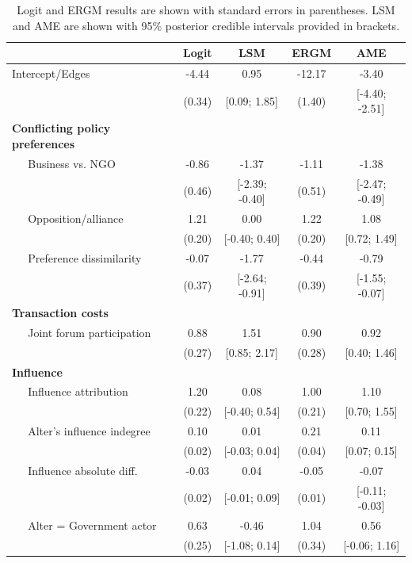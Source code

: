 \documentclass[12pt,pdflatex]{elsarticle}
\begin{document}
\begin{table}[ht]
\centering
\caption{Logit and ERGM results are shown with standard errors in parentheses. LSM and AME are shown with 95\% posterior credible intervals provided in brackets.}
\begin{tabular}{lcccc}
   & Logit & LSM & ERGM & AME \\ 
  \hline\hline
  Intercept/Edges & -4.44 & 0.95 & -12.17 & -3.40 \\ 
   & (0.34) & [0.09; 1.85] & (1.40) & [-4.40; -2.51] \\ 
  \textbf{Conflicting policy preferences} &  &  &  &  \\ 
  $\;\;\;\;$ Business vs. NGO & -0.86 & -1.37 & -1.11 & -1.38 \\ 
   & (0.46) & [-2.39; -0.40] & (0.51) & [-2.47; -0.49] \\ 
  $\;\;\;\;$ Opposition/alliance & 1.21 & 0.00 & 1.22 & 1.08 \\ 
   & (0.20) & [-0.40; 0.40] & (0.20) & [0.72; 1.49] \\ 
  $\;\;\;\;$ Preference dissimilarity & -0.07 & -1.77 & -0.44 & -0.79 \\ 
   & (0.37) & [-2.64; -0.91] & (0.39) & [-1.55; -0.07] \\ 
  \textbf{Transaction costs} &  &  &  &  \\ 
  $\;\;\;\;$ Joint forum participation & 0.88 & 1.51 & 0.90 & 0.92 \\ 
   & (0.27) & [0.85; 2.17] & (0.28) & [0.40; 1.46] \\ 
  \textbf{Influence} &  &  &  &  \\ 
  $\;\;\;\;$ Influence attribution & 1.20 & 0.08 & 1.00 & 1.10 \\ 
   & (0.22) & [-0.40; 0.54] & (0.21) & [0.70; 1.55] \\ 
  $\;\;\;\;$ Alter's influence indegree & 0.10 & 0.01 & 0.21 & 0.11 \\ 
   & (0.02) & [-0.03; 0.04] & (0.04) & [0.07; 0.15] \\ 
  $\;\;\;\;$ Influence absolute diff. & -0.03 & 0.04 & -0.05 & -0.07 \\ 
   & (0.02) & [-0.01; 0.09] & (0.01) & [-0.11; -0.03] \\ 
  $\;\;\;\;$ Alter = Government actor & 0.63 & -0.46 & 1.04 & 0.56 \\ 
   & (0.25) & [-1.08; 0.14] & (0.34) & [-0.06; 1.16] \\ 

\end{tabular}
\end{table}
\end{document}
